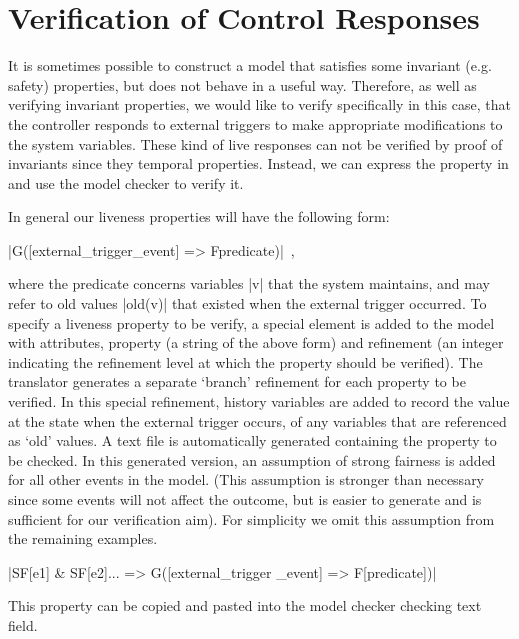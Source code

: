 

\section{Verification of Control Responses}
\label{sec:verificationResponses}

It is sometimes possible to construct a model that satisfies some invariant (e.g. safety) properties, but does not behave in a useful way.
Therefore, as well as verifying invariant properties, we would like to verify  specifically in this case, that the controller responds to external triggers to make appropriate modifications to the system variables. 
These kind of live responses can not be verified by proof of invariants since they  temporal properties.
Instead, we can express the property in \LTL  and use the \PROB model checker to verify it.

In general our liveness properties will have the following form:
\begin{center}
  |G([external_trigger_event] => F{predicate})|~,
\end{center}
where the predicate concerns variables |v| that the system maintains, and may refer to old values |old(v)| that existed when the external trigger occurred.
To specify a liveness property to be verify, a special \LTL element is added to the \SCXML model with attributes, property (a string of the above form)  and refinement (an integer indicating the refinement level at which the property should be verified).
The translator generates a separate `branch' refinement for each \LTL property to be verified. 
In this special refinement, history variables are added to record the value at the state when the external trigger occurs, of any variables that are referenced as `old' values.
A text file is automatically generated containing the \LTL property to be checked. 
In this generated version, an assumption of strong fairness is added for all other events in the model.
(This assumption is stronger than necessary since some events will not affect the outcome, but is easier to generate and is sufficient for our verification aim). 
For simplicity we omit this assumption from the remaining examples.
\begin{center}
  |SF[e1] & SF[e2]... => G([external_trigger _event] => F[predicate])|
\end{center}
This property can be copied and pasted into the \PROB model checker \LTL checking text field.

